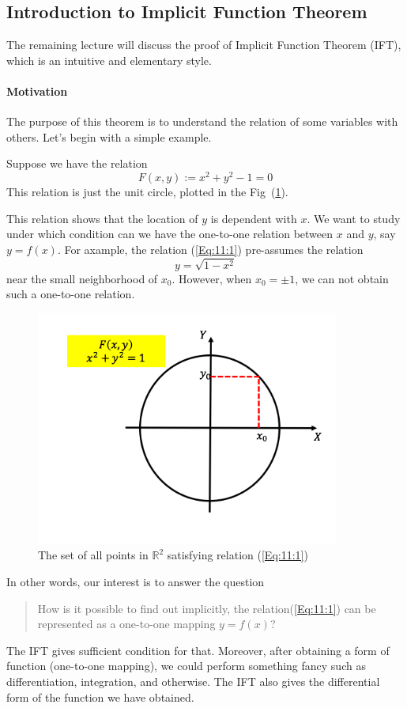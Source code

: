 \subsection{Introduction to Implicit Function Theorem}
The remaining lecture will discuss the proof of Implicit Function Theorem (IFT), which is an intuitive and elementary style.

\paragraph{Motivation}
The purpose of this theorem is to understand the relation of some variables with others. Let's begin with a simple example. 
\begin{example}
Suppose we have the relation
\begin{equation}\label{Eq:11:1}
F(x,y):=x^2+y^2-1=0
\end{equation}
This relation is just the unit circle, plotted in the Fig~(\ref{fig:11:1}).

This relation shows that the location of $y$ is dependent with $x$. We want to study under which condition can we have the one-to-one relation between $x$ and $y$, say $y=f(x)$. For axample, the relation (\ref{Eq:11:1}) pre-assumes the relation
\[
y=\sqrt{1-x^2}
\]
near the small neighborhood of $x_0$. However, when $x_0=\pm1$, we can not obtain such a one-to-one relation.
\begin{figure}[H]\label{fig:11:1}
\centering
\includegraphics[width=10cm]{week11/F_11_1}
\caption{The set of all points in $\mathbb{R}^2$ satisfying relation (\ref{Eq:11:1})}
\end{figure}
\end{example}
In other words, our interest is to answer the question
\begin{quotation}
How is it possible to find out implicitly, the relation(\ref{Eq:11:1}) can be represented as a one-to-one mapping $y=f(x)$?
\end{quotation}
The IFT gives sufficient condition for that. Moreover, after obtaining a form of function (one-to-one mapping), we could perform something fancy such as differentiation, integration, and otherwise. The IFT also gives the differential form of the function we have obtained.

